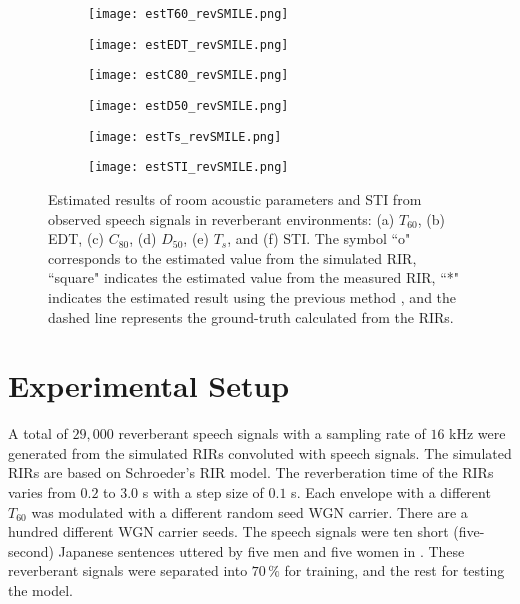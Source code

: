 \documentclass[conference]{IEEEtran}
\begin{document}
	\begin{figure*}[htpb!]
		\hfill
		\begin{subfigure}
			\centering
			\texttt{[image: estT60\_revSMILE.png]}
			\label{fig:T60_SMILE}
		\end{subfigure}
		\hfill
		\begin{subfigure}
			\centering
			\texttt{[image: estEDT\_revSMILE.png]}
			\label{fig:EDT_SMILE}
		\end{subfigure}
		
		\hfill
		\begin{subfigure}
			\centering
			\texttt{[image: estC80\_revSMILE.png]}
			\label{fig:C80_SMILE}
		\end{subfigure}
		\hfill
		\begin{subfigure}
			\centering
			\texttt{[image: estD50\_revSMILE.png]}
			\label{fig:D50_SMILE}
		\end{subfigure}
		\hfill
		\begin{subfigure}
			\centering
			\texttt{[image: estTs\_revSMILE.png]}
			\label{fig:Ts_SMILE}
		\end{subfigure}
		\hfill
		\begin{subfigure}
			\centering
			\texttt{[image: estSTI\_revSMILE.png]}
			\label{fig:STI_SMILE}
		\end{subfigure}
		\centering
		\caption{Estimated results of room acoustic parameters and STI from observed speech signals in reverberant environments: (a) $T_{60}$, (b) EDT, (c) $C_{80}$, (d) $D_{50}$, (e) $T_s$, and (f) STI. The symbol ``o" corresponds to the estimated value from the simulated RIR, ``square" indicates the estimated value from the measured RIR, ``*" indicates the estimated result using the previous method \cite{MU_T60,Me_APSIPA2019}, and the dashed line represents the ground-truth calculated from the RIRs.}
		\label{fig:condition3_SMILEdataset}
	\end{figure*}
	
	\section{Experimental Setup}
	A total of $29,000$ reverberant speech signals with a sampling rate of $16$ kHz were generated from the simulated RIRs convoluted with speech signals. The simulated RIRs are based on Schroeder's RIR model. The reverberation time of the RIRs varies from $0.2$ to $3.0$ s with a step size of $0.1$ s. Each envelope with a different $T_{60}$ was modulated with a different random seed WGN carrier. There are a hundred different WGN carrier seeds. The speech signals were ten short (five-second) Japanese sentences uttered by five men and five women in . These reverberant signals were separated into $70\,\%$ for training, and the rest for testing the model. 
	
\end{document}
